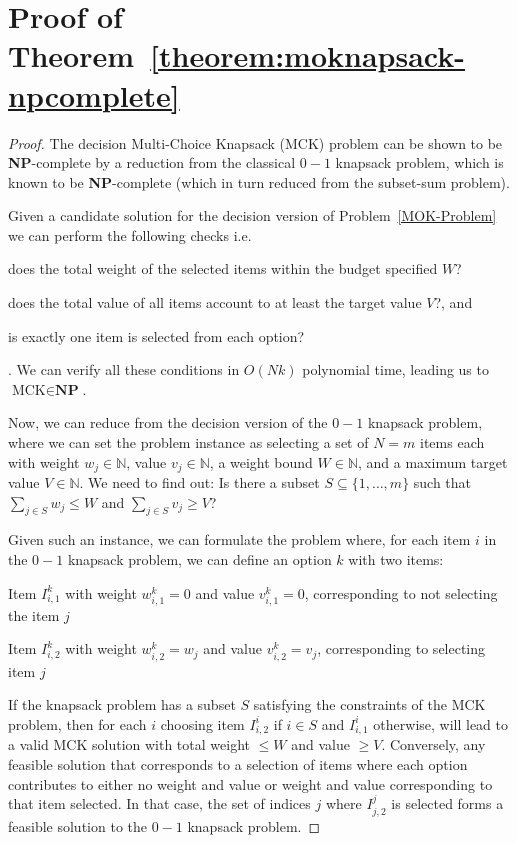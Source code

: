 \section{Proof of Theorem~\ref{theorem:moknapsack-npcomplete}} \label{appendix:proof-theorem3}

\moknapsacknpcomplete*
\begin{proof}
    The decision Multi-Choice Knapsack (MCK) problem can be shown to be \textbf{NP}-complete by a reduction from the classical $0-1$ knapsack problem, which is known to be \textbf{NP}-complete (which in turn reduced from the subset-sum problem). 

    Given a candidate solution for the decision version of Problem~\ref{MOK-Problem} we can perform the following checks i.e. \begin{inparaenum}[(a)]
        \item does the total weight of the selected items within the budget specified $W$?
        \item does the total value of all items account to at least the target value $V$?, and
        \item is exactly one item is selected from each option?
    \end{inparaenum}. We can verify all these conditions in $O(Nk)$ polynomial time, leading us to $\text{MCK} \in \textbf{NP}$.

    Now, we can reduce from the decision version of the $0-1$ knapsack problem, where we can set the problem instance as selecting a set of $N = m$ items each with weight $w_j \in \mathbb{N}$, value $v_j \in \mathbb{N}$, a weight bound $W \in \mathbb{N}$, and a maximum target value $V \in \mathbb{N}$. We need to find out: Is there a subset $S \subseteq \{1, \dots, m\}$ such that $\sum_{j \in S} w_j \leq W$ and $\sum_{j \in S} v_j \geq V$?

    Given such an instance, we can formulate the problem where, for each item $i$ in the $0-1$ knapsack problem, we can define an option $k$ with two items:
    \begin{compactenum}
        \item Item $I^k_{i,1}$ with weight $w^k_{i,1} = 0$ and value $v^k_{i,1} = 0$, corresponding to not selecting the item $j$
        \item Item $I^k_{i,2}$ with weight $w^k_{i,2} = w_j$ and value $v^k_{i,2} = v_j$, corresponding to selecting item $j$
    \end{compactenum}
    If the knapsack problem has a subset $S$ satisfying the constraints of the MCK problem, then for each $i$ choosing item $I^i_{i,2}$ if $i \in S$ and $I^i_{i,1}$ otherwise, will lead to a valid MCK solution with total weight $\leq W$ and value $\geq V$. Conversely, any feasible solution that corresponds to a selection of items where each option contributes to either no weight and value or weight and value corresponding to that item selected. In that case, the set of indices $j$ where $I^j_{j,2}$ is selected forms a feasible solution to the $0-1$ knapsack problem.
    

\end{proof}
